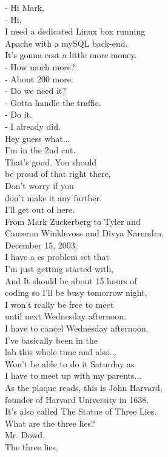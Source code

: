 \documentclass{article}
\begin{document}
\begin{multicols}{3}
- Hi Mark,\\
- Hi,\\
I need a dedicated Linux box running\\
Apache with a mySQL back-end.\\
It's gonna cost a little more money.\\
- How much more?\\
- About 200 more.\\
- Do we need it?\\
- Gotta handle the traffic.\\
- Do it.\\
- I already did.\\
Hey guess what...\\
I'm in the 2nd cut.\\
That's good. You should\\
be proud of that right there,\\
Don't worry if you\\
don't make it any further.\\
I'll get out of here.\\
From Mark Zuckerberg to Tyler and\\
Cameron Winklevoss and Divya Narendra.\\
December 15, 2003.\\
I have a cs problem set that\\
I'm just getting started with,\\
And It should be about 15 hours of\\
coding so I'll be busy tomorrow night,\\
I won't really be free to meet\\
until next Wednesday afternoon.\\
I have to cancel Wednesday afternoon.\\
I've basically been in the\\
lab this whole time and also...\\
Won't be able to do it Saturday as\\
I have to meet up with my parents...\\
As the plaque reads, this is John Harvard,\\
founder of Harvard University in 1638.\\
It's also called The Statue of Three Lies.\\
What are the three lies?\\
Mr. Dowd.\\
The three lies,\\

\end{multicols}
\end{document}
